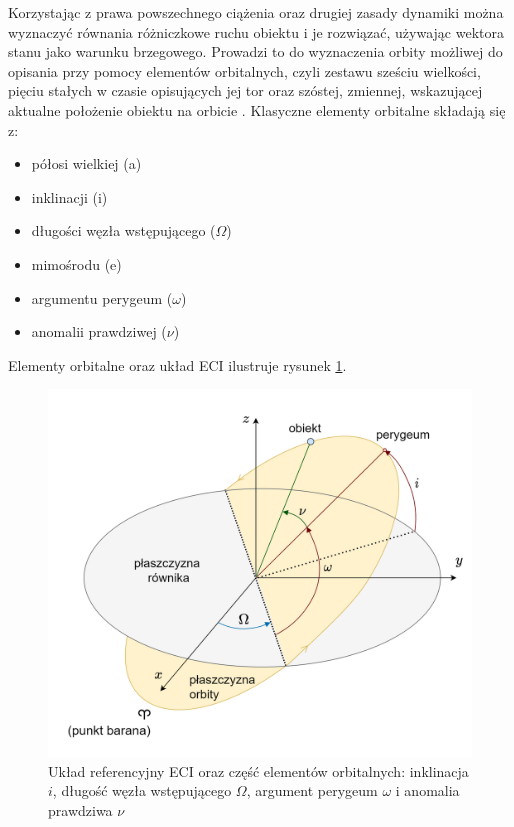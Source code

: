 Korzystając z prawa powszechnego ciążenia oraz drugiej zasady dynamiki można wyznaczyć równania różniczkowe ruchu obiektu i je rozwiązać, używając wektora stanu jako warunku brzegowego. Prowadzi to do wyznaczenia orbity możliwej do opisania przy pomocy elementów orbitalnych, czyli zestawu sześciu wielkości, pięciu stałych w czasie opisujących jej tor oraz szóstej, zmiennej, wskazującej aktualne położenie obiektu na orbicie \cite{CurtisWektorStanuWOE}. 
Klasyczne elementy orbitalne składają się z:
\begin{itemize}
 \item półosi wielkiej (a)
\item inklinacji (i)
\item długości węzła wstępującego ($\Omega$)
\item mimośrodu (e)
\item argumentu perygeum ($\omega$)
\item anomalii prawdziwej ($\nu$)
\end{itemize}
Elementy orbitalne oraz układ ECI ilustruje rysunek \ref{fig:elementy-szkic}.



    \begin{figure}[h]
    \centering
    \includegraphics[width=\textwidth]{tex/img/diagramelementy.png}
    \caption{Układ referencyjny ECI oraz część elementów orbitalnych: inklinacja $i$, długość węzła wstępującego $\Omega$, argument perygeum $\omega$ i anomalia prawdziwa $\nu$}
    \label{fig:elementy-szkic}
    \end{figure}


